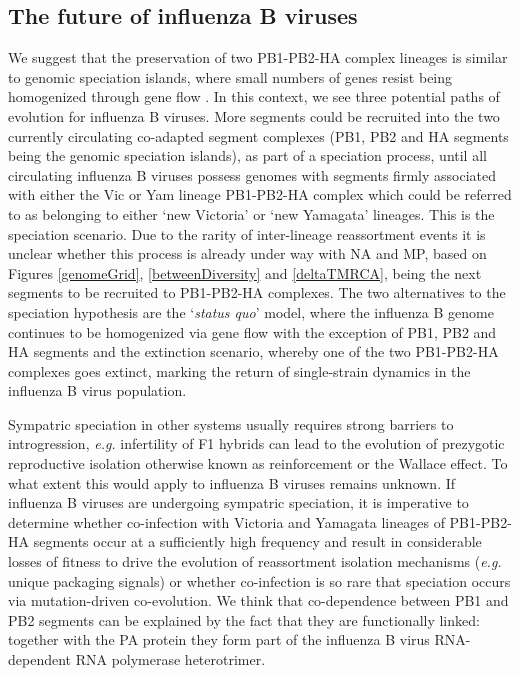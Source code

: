 \documentclass[11pt,oneside,letterpaper]{article}
\begin{document}
\subsection*{The future of influenza B viruses}
We suggest that the preservation of two PB1-PB2-HA complex lineages is similar to genomic speciation islands, where small numbers of genes resist being homogenized through gene flow \citep{turner2005}.
In this context, we see three potential paths of evolution for influenza B viruses.
More segments could be recruited into the two currently circulating co-adapted segment complexes (PB1, PB2 and HA segments being the genomic speciation islands), as part of a speciation process, until all circulating influenza B viruses possess genomes with segments firmly associated with either the Vic or Yam lineage PB1-PB2-HA complex which could be referred to as belonging to either `new Victoria' or `new Yamagata' lineages.
This is the speciation scenario.
Due to the rarity of inter-lineage reassortment events it is unclear whether this process is already under way with NA and MP, based on Figures \ref{genomeGrid}, \ref{betweenDiversity} and \ref{deltaTMRCA}, being the next segments to be recruited to PB1-PB2-HA complexes.
The two alternatives to the speciation hypothesis are the `\textit{status quo}' model, where the influenza B genome continues to be homogenized via gene flow with the exception of PB1, PB2 and HA segments and the extinction scenario, whereby one of the two PB1-PB2-HA complexes goes extinct, marking the return of single-strain dynamics in the influenza B virus population.

Sympatric speciation in other systems usually requires strong barriers to introgression, \textit{e.g.} infertility of F1 hybrids can lead to the evolution of prezygotic reproductive isolation otherwise known as reinforcement or the Wallace effect.
To what extent this would apply to influenza B viruses remains unknown.
If influenza B viruses are undergoing sympatric speciation, it is imperative to determine whether co-infection with Victoria and Yamagata lineages of PB1-PB2-HA segments occur at a sufficiently high frequency and result in considerable losses of fitness to drive the evolution of reassortment isolation mechanisms (\textit{e.g.} unique packaging signals) or whether co-infection is so rare that speciation occurs via mutation-driven co-evolution.
We think that co-dependence between PB1 and PB2 segments can be explained by the fact that they are functionally linked: together with the PA protein they form part of the influenza B virus RNA-dependent RNA polymerase heterotrimer.
\end{document}
